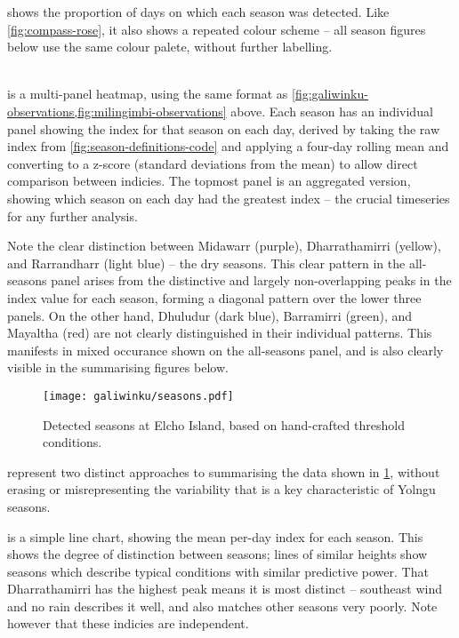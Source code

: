  shows the proportion of days on which
each season was detected.  Like \cref{fig:compass-rose}, it also
shows a repeated colour scheme -- all season figures below use the
same colour palete, without further labelling.

~\\

 is a multi-panel heatmap, using the same format
as \cref{fig:galiwinku-observations,fig:milingimbi-observations} above.
Each season has an individual panel showing the index for that season on each
day, derived by taking the raw index from \cref{fig:season-definitions-code}
and applying a four-day rolling mean and converting to a z-score (standard
deviations from the mean) to allow direct comparison between indicies.
%
The topmost panel is an aggregated version, showing which season on each day
had the greatest index -- the crucial timeseries for any further analysis.

Note the clear distinction between Midawarr (purple), Dharrathamirri (yellow),
and Rarrandharr (light blue) -- the dry seasons.  This clear pattern in the
all-seasons panel arises from the distinctive and largely non-overlapping
peaks in the index value for each season, forming a diagonal pattern over
the lower three panels.
%
On the other hand, Dhuludur (dark blue), Barramirri (green), and Mayaltha
(red) are not clearly distinguished in their individual patterns.  This
manifests in mixed occurance shown on the all-seasons panel, and is also
clearly visible in the summarising figures below.\\


\begin{figure}[p]
    \centering
    \texttt{[image: galiwinku/seasons.pdf]}
    \caption[Detected seasons for Elcho Island]{
        Detected seasons at Elcho Island, based on hand-crafted threshold
        conditions.  
        }
    \label{fig:galiwinku-seasons}
\end{figure}


 represent two distinct
approaches to summarising the data shown in \cref{fig:galiwinku-seasons},
without erasing or misrepresenting the variability that is a key
characteristic of Yolngu seasons.

 is a simple line chart, showing the mean
per-day index for each season.  This shows the degree of distinction
between seasons; lines of similar heights show seasons which describe
typical conditions with similar predictive power.  That Dharrathamirri
has the highest peak means it is most distinct -- southeast wind and no
rain describes it well, and also matches other seasons very poorly.
Note however that these indicies are independent.\\

